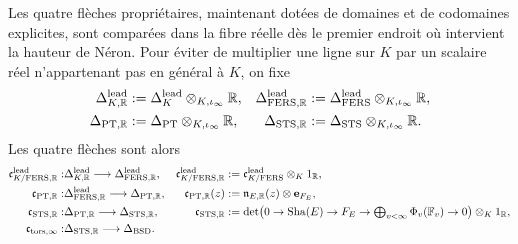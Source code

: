 Les quatre flèches propriétaires, maintenant dotées de domaines et de codomaines explicites,
sont comparées dans la fibre réelle dès le premier endroit où intervient la
hauteur de Néron. Pour éviter de multiplier une ligne sur $K$ par un
scalaire réel n'appartenant pas en général à $K$, on fixe
\begin{equation}\label{eq:pdf2-bsd-lineas-reales-comparador}
 \begin{aligned}
  \Delta_{K,\mathbb R}^{\rm lead}
    &:=\Delta_K^{\rm lead}\otimes_{K,\iota_\infty}\mathbb R,&
  \Delta_{{\rm FERS},\mathbb R}^{\rm lead}
    &:=\Delta_{\rm FERS}^{\rm lead}\otimes_{K,\iota_\infty}\mathbb R,\\
  \Delta_{{\rm PT},\mathbb R}
    &:=\Delta_{\rm PT}\otimes_{K,\iota_\infty}\mathbb R,&
  \Delta_{{\rm STS},\mathbb R}
    &:=\Delta_{\rm STS}\otimes_{K,\iota_\infty}\mathbb R.
 \end{aligned}
\end{equation}
Les quatre flèches sont alors
\begin{equation}\label{eq:pdf2-bsd-cuatro-comparadores}
\begin{aligned}
 \mathfrak c_{K/{\rm FERS},\mathbb R}^{\rm lead}:
   &\Delta_{K,\mathbb R}^{\rm lead}
      \longrightarrow\Delta_{{\rm FERS},\mathbb R}^{\rm lead},
 &\mathfrak c_{K/{\rm FERS},\mathbb R}^{\rm lead}
   &:=\mathfrak c_{K/{\rm FERS}}^{\rm lead}\otimes_K1_{\mathbb R},\\
 \mathfrak c_{{\rm PT},\mathbb R}:
   &\Delta_{{\rm FERS},\mathbb R}^{\rm lead}
      \longrightarrow\Delta_{{\rm PT},\mathbb R},
 &\mathfrak c_{{\rm PT},\mathbb R}(z)&:=
   \mathfrak n_{E,\mathbb R}(z)\otimes\mathbf e_{F_E},\\
 \mathfrak c_{{\rm STS},\mathbb R}:
   &\Delta_{{\rm PT},\mathbb R}
      \longrightarrow\Delta_{{\rm STS},\mathbb R},
 &\mathfrak c_{{\rm STS},\mathbb R}&:=\det\bigl(
   0\to\operatorname{Sha}(E)\to F_E
     \to\textstyle\bigoplus_{v<\infty}\Phi_v(\mathbb F_v)
     \to0\bigr)\otimes_K1_{\mathbb R},\\
 \mathfrak c_{\rm tors,\infty}:
   &\Delta_{{\rm STS},\mathbb R}
      \longrightarrow\Delta_{\rm BSD}.&&
\end{aligned}
\end{equation}

